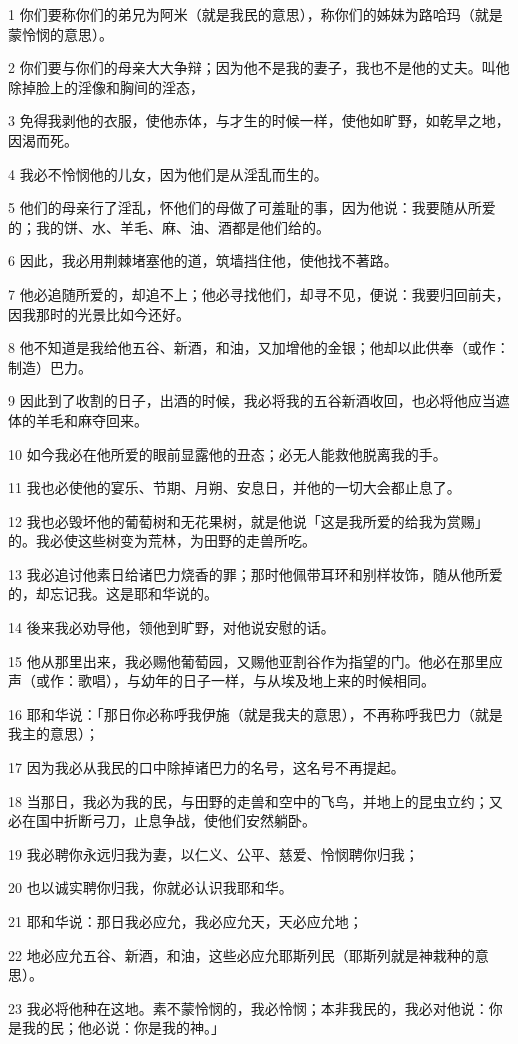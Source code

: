 \par 1 你们要称你们的弟兄为阿米（就是我民的意思），称你们的姊妹为路哈玛（就是蒙怜悯的意思）。
\par 2 你们要与你们的母亲大大争辩；因为他不是我的妻子，我也不是他的丈夫。叫他除掉脸上的淫像和胸间的淫态，
\par 3 免得我剥他的衣服，使他赤体，与才生的时候一样，使他如旷野，如乾旱之地，因渴而死。
\par 4 我必不怜悯他的儿女，因为他们是从淫乱而生的。
\par 5 他们的母亲行了淫乱，怀他们的母做了可羞耻的事，因为他说：我要随从所爱的；我的饼、水、羊毛、麻、油、酒都是他们给的。
\par 6 因此，我必用荆棘堵塞他的道，筑墙挡住他，使他找不著路。
\par 7 他必追随所爱的，却追不上；他必寻找他们，却寻不见，便说：我要归回前夫，因我那时的光景比如今还好。
\par 8 他不知道是我给他五谷、新酒，和油，又加增他的金银；他却以此供奉（或作：制造）巴力。
\par 9 因此到了收割的日子，出酒的时候，我必将我的五谷新酒收回，也必将他应当遮体的羊毛和麻夺回来。
\par 10 如今我必在他所爱的眼前显露他的丑态；必无人能救他脱离我的手。
\par 11 我也必使他的宴乐、节期、月朔、安息日，并他的一切大会都止息了。
\par 12 我也必毁坏他的葡萄树和无花果树，就是他说「这是我所爱的给我为赏赐」的。我必使这些树变为荒林，为田野的走兽所吃。
\par 13 我必追讨他素日给诸巴力烧香的罪；那时他佩带耳环和别样妆饰，随从他所爱的，却忘记我。这是耶和华说的。
\par 14 後来我必劝导他，领他到旷野，对他说安慰的话。
\par 15 他从那里出来，我必赐他葡萄园，又赐他亚割谷作为指望的门。他必在那里应声（或作：歌唱），与幼年的日子一样，与从埃及地上来的时候相同。
\par 16 耶和华说：「那日你必称呼我伊施（就是我夫的意思），不再称呼我巴力（就是我主的意思）；
\par 17 因为我必从我民的口中除掉诸巴力的名号，这名号不再提起。
\par 18 当那日，我必为我的民，与田野的走兽和空中的飞鸟，并地上的昆虫立约；又必在国中折断弓刀，止息争战，使他们安然躺卧。
\par 19 我必聘你永远归我为妻，以仁义、公平、慈爱、怜悯聘你归我；
\par 20 也以诚实聘你归我，你就必认识我耶和华。
\par 21 耶和华说：那日我必应允，我必应允天，天必应允地；
\par 22 地必应允五谷、新酒，和油，这些必应允耶斯列民（耶斯列就是神栽种的意思）。
\par 23 我必将他种在这地。素不蒙怜悯的，我必怜悯；本非我民的，我必对他说：你是我的民；他必说：你是我的神。」

